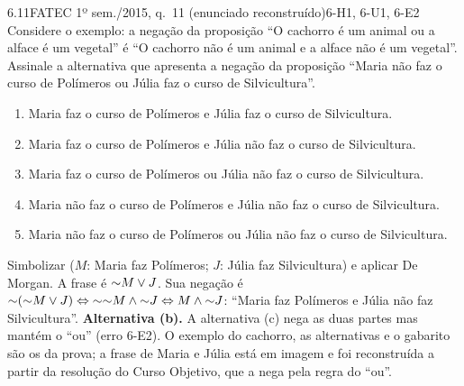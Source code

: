 \Exemplos

\begin{exemplo}{6.1}{1}{FATEC 1º sem./2015, q.~11 (enunciado reconstruído)}{6-H1, 6-U1, 6-E2}\label{ex:6.1}
Considere o exemplo: a negação da proposição \enquote{O cachorro é um animal ou a alface é um vegetal} é \enquote{O cachorro não é um animal e a alface não é um vegetal}. Assinale a alternativa que apresenta a negação da proposição \enquote{Maria não faz o curso de Polímeros ou Júlia faz o curso de Silvicultura}.
\begin{enumerate}[label=(\alph*)]
  \item Maria faz o curso de Polímeros e Júlia faz o curso de Silvicultura.
  \item Maria faz o curso de Polímeros e Júlia não faz o curso de Silvicultura.
  \item Maria faz o curso de Polímeros ou Júlia não faz o curso de Silvicultura.
  \item Maria não faz o curso de Polímeros e Júlia não faz o curso de Silvicultura.
  \item Maria não faz o curso de Polímeros ou Júlia não faz o curso de Silvicultura.
\end{enumerate}
\plano Simbolizar ($M$: Maria faz Polímeros; $J$: Júlia faz Silvicultura) e aplicar De Morgan.
\resolucao
A frase é ${{\sim}}M\vee J$. Sua negação é ${{\sim}}({{\sim}}M\vee J)\Leftrightarrow{{\sim}}{{\sim}}M\wedge{{\sim}}J\Leftrightarrow M\wedge{{\sim}}J$: \enquote{Maria faz Polímeros e Júlia não faz Silvicultura}. \textbf{Alternativa (b).}
\comentario A alternativa (c) nega as duas partes mas mantém o \enquote{ou} (erro 6-E2). O exemplo do cachorro, as alternativas e o gabarito são os da prova; a frase de Maria e Júlia está em imagem e foi reconstruída a partir da resolução do Curso Objetivo, que a nega pela regra do \enquote{ou}.
\end{exemplo}

